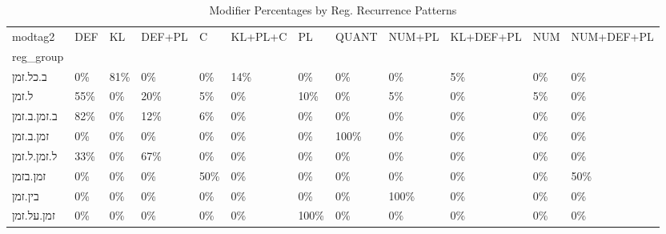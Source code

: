 \begin{table}[htbp!]
\centering
\caption{Modifier Percentages by Reg. Recurrence Patterns}
\label{table:regrecmod_pc}
\begin{adjustbox}{width=1\textwidth}
\begin{tabular}{llllllllllll}
\toprule
modtag2 &  DEF &   KL & DEF+PL &    C & KL+PL+C &    PL & QUANT & NUM+PL & KL+DEF+PL & NUM & NUM+DEF+PL \\
reg\_group   &      &      &        &      &         &       &       &        &           &     &            \\
\midrule
ב.כל.זמן    &   0\% &  81\% &     0\% &   0\% &     14\% &    0\% &    0\% &     0\% &        5\% &  0\% &         0\% \\
ל.זמן       &  55\% &   0\% &    20\% &   5\% &      0\% &   10\% &    0\% &     5\% &        0\% &  5\% &         0\% \\
ב.זמן.ב.זמן &  82\% &   0\% &    12\% &   6\% &      0\% &    0\% &    0\% &     0\% &        0\% &  0\% &         0\% \\
זמן.ב.זמן   &   0\% &   0\% &     0\% &   0\% &      0\% &    0\% &  100\% &     0\% &        0\% &  0\% &         0\% \\
ל.זמן.ל.זמן &  33\% &   0\% &    67\% &   0\% &      0\% &    0\% &    0\% &     0\% &        0\% &  0\% &         0\% \\
זמן.בזמן    &   0\% &   0\% &     0\% &  50\% &      0\% &    0\% &    0\% &     0\% &        0\% &  0\% &        50\% \\
בין.זמן     &   0\% &   0\% &     0\% &   0\% &      0\% &    0\% &    0\% &   100\% &        0\% &  0\% &         0\% \\
זמן.על.זמן  &   0\% &   0\% &     0\% &   0\% &      0\% &  100\% &    0\% &     0\% &        0\% &  0\% &         0\% \\
\bottomrule
\end{tabular}
\end{adjustbox}
\end{table}
